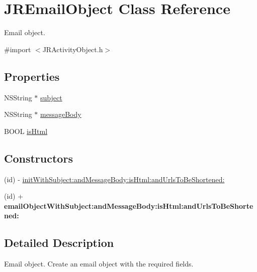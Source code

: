 \hypertarget{interface_j_r_email_object}{
\section{JREmailObject Class Reference}
\label{interface_j_r_email_object}
}


Email object.  




{\ttfamily \#import $<$JRActivityObject.h$>$}

\subsection*{Properties}
\begin{DoxyCompactItemize}
\item 
NSString $\ast$ \hyperlink{interface_j_r_email_object_a618a23c34ede4a4eb56ed6cf05d91b64}{subject}
\item 
NSString $\ast$ \hyperlink{interface_j_r_email_object_ad0e6a07cb2aec3cf6eee75d2ace32e7d}{messageBody}
\item 
BOOL \hyperlink{interface_j_r_email_object_af372942f67fba5e93fb2b53f4ee8a3c5}{isHtml}
\end{DoxyCompactItemize}
\subsection*{Constructors}
\label{_amgrp559a25fdb98a7d1fd1c3771ac568d5e9}
 \begin{DoxyCompactItemize}
\item 
(id) -\/ \hyperlink{interface_j_r_email_object_aa911e84f7b1f7e8c4fd15009dbdc6783}{initWithSubject:andMessageBody:isHtml:andUrlsToBeShortened:}
\item 
\hypertarget{interface_j_r_email_object_aea1535d69b58d30295e5b88f93d0a474}{
(id) + {\bfseries emailObjectWithSubject:andMessageBody:isHtml:andUrlsToBeShortened:}}
\label{interface_j_r_email_object_aea1535d69b58d30295e5b88f93d0a474}

\end{DoxyCompactItemize}


\subsection{Detailed Description}
Email object. Create an email object with the required fields. 

